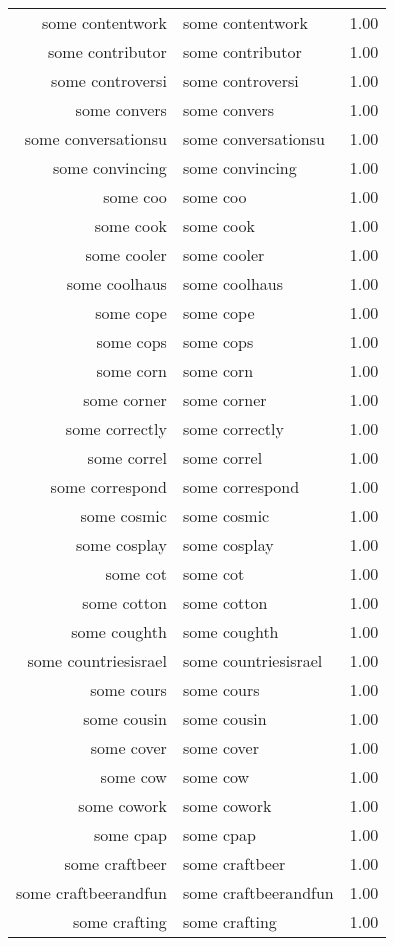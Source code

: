\begin{table}[ht]
\begin{tabular}{rlr}
  some contentwork & some contentwork & 1.00 \\ 
  some contributor & some contributor & 1.00 \\ 
  some controversi & some controversi & 1.00 \\ 
  some convers & some convers & 1.00 \\ 
  some conversationsu & some conversationsu & 1.00 \\ 
  some convincing & some convincing & 1.00 \\ 
  some coo & some coo & 1.00 \\ 
  some cook & some cook & 1.00 \\ 
  some cooler & some cooler & 1.00 \\ 
  some coolhaus & some coolhaus & 1.00 \\ 
  some cope & some cope & 1.00 \\ 
  some cops & some cops & 1.00 \\ 
  some corn & some corn & 1.00 \\ 
  some corner & some corner & 1.00 \\ 
  some correctly & some correctly & 1.00 \\ 
  some correl & some correl & 1.00 \\ 
  some correspond & some correspond & 1.00 \\ 
  some cosmic & some cosmic & 1.00 \\ 
  some cosplay & some cosplay & 1.00 \\ 
  some cot & some cot & 1.00 \\ 
  some cotton & some cotton & 1.00 \\ 
  some coughth & some coughth & 1.00 \\ 
  some countriesisrael & some countriesisrael & 1.00 \\ 
  some cours & some cours & 1.00 \\ 
  some cousin & some cousin & 1.00 \\ 
  some cover & some cover & 1.00 \\ 
  some cow & some cow & 1.00 \\ 
  some cowork & some cowork & 1.00 \\ 
  some cpap & some cpap & 1.00 \\ 
  some craftbeer & some craftbeer & 1.00 \\ 
  some craftbeerandfun & some craftbeerandfun & 1.00 \\ 
  some crafting & some crafting & 1.00 \\ 

\end{tabular}
\end{table}
